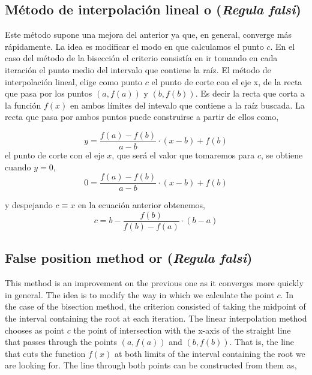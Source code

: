 \begin{paracol}{2}
\subsection{Método de interpolación lineal o (\emph{Regula falsi})}
Este método supone una mejora del anterior ya que, en general,  converge más rápidamente. La idea es modificar el modo en que calculamos el punto $c$. En el caso del método de la bisección el criterio consistía en ir tomando en cada iteración el punto medio del intervalo que contiene la raíz. El método de interpolación lineal, elige como punto $c$ el punto de corte con el eje x, de la recta que pasa por los puntos $\left(a,f(a)\right)$ y $\left(b,f(b)\right)$. Es decir la recta que corta a la función $f(x)$ en ambos límites del intevalo que contiene a la raíz buscada. La recta que pasa por ambos puntos puede construirse a partir de ellos como,

\begin{equation*}
y=\frac{f(a)-f(b)}{a-b}\cdot(x-b)+f(b)
\end{equation*}
el punto de corte con el eje $x$, que será el valor que tomaremos para $c$, se obtiene cuando $y=0$,
\begin{equation*}
0=\frac{f(a)-f(b)}{a-b}\cdot(x-b)+f(b)
\end{equation*}

y despejando $c\equiv x$ en la ecuación anterior obtenemos,
\begin{equation*}
c=b-\frac{f(b)}{f(b)-f(a)}\cdot(b-a)
\end{equation*}

\switchcolumn

\subsection{False position method or (\emph{Regula falsi})}

This method is an improvement on the previous one as it converges more quickly in general. The idea is to modify the way in which we calculate the point $c$. In the case of the bisection method, the criterion consisted of taking the midpoint of the interval containing the root at each iteration. The linear interpolation method chooses as point $c$ the point of intersection with the x-axis of the straight line that passes through the points $\left(a,f(a)\right)$ and $\left(b,f(b)\right)$. That is, the line that cuts the function $f(x)$ at both limits of the interval containing the root we are looking for. The line through both points can be constructed from them as,


\end{paracol}
